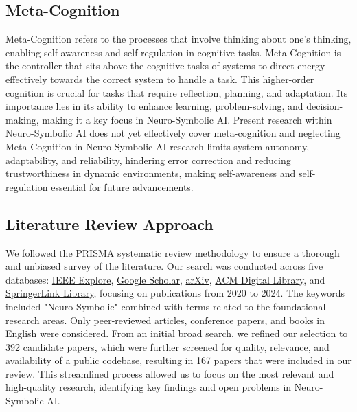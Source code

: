 \documentclass[hf]{ceurart}
\begin{document}
\subsection{Meta-Cognition}\label{subsec:method_meta}
Meta-Cognition refers to the processes that involve thinking about one's thinking, enabling self-awareness and self-regulation in cognitive tasks. Meta-Cognition is the controller that sits above the cognitive tasks of systems to direct energy effectively towards the correct system to handle a task. This higher-order cognition is crucial for tasks that require reflection, planning, and adaptation. Its importance lies in its ability to enhance learning, problem-solving, and decision-making, making it a key focus in Neuro-Symbolic AI. Present research within Neuro-Symbolic AI does not yet effectively cover meta-cognition and neglecting Meta-Cognition in Neuro-Symbolic AI research limits system autonomy, adaptability, and reliability, hindering error correction and reducing trustworthiness in dynamic environments, making self-awareness and self-regulation essential for future advancements.



\subsection{Literature Review Approach}

We followed the \href{https://www.prisma-statement.org/}{PRISMA} systematic review methodology to ensure a thorough and unbiased survey of the literature. Our search was conducted across five databases: \href{https://ieeexplore.ieee.org/Xplore/home.jsp}{IEEE Explore}, \href{http://scholar.google.com}{Google Scholar}, \href{https://arxiv.org/}{arXiv}, \href{http://portal.acm.org/portal.cfm}{ACM Digital Library}, and \href{http://www.springerlink.com}{SpringerLink Library}, focusing on publications from 2020 to 2024. The keywords included "Neuro-Symbolic" combined with terms related to the foundational research areas. Only peer-reviewed articles, conference papers, and books in English were considered. From an initial broad search, we refined our selection to 392 candidate papers, which were further screened for quality, relevance, and availability of a public codebase, resulting in 167 papers that were included in our review. This streamlined process allowed us to focus on the most relevant and high-quality research, identifying key findings and open problems in Neuro-Symbolic AI. 
\end{document}
